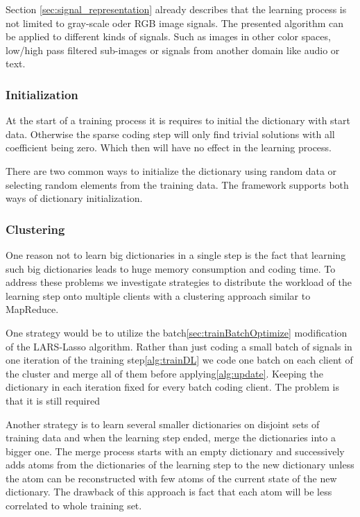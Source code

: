 Section \ref{sec:signal_representation} already describes that the learning
process is not limited to gray-scale oder RGB image signals. The presented
algorithm can be applied to different kinds of signals. Such as images in other
color spaces, low/high pass filtered sub-images or signals from another domain
like audio or text. 


\subsubsection{Initialization}
At the start of a training process it is requires to initial the
dictionary with start data. Otherwise the sparse coding step will only find
trivial solutions with all coefficient being zero. Which then will have no
effect in the learning process.

There are two common ways to initialize the dictionary using random data or
selecting random elements from the training data. The framework supports 
both ways of dictionary initialization. 


\subsubsection{Clustering}
One reason not to learn big dictionaries in a single step is the fact that
learning such big dictionaries leads to huge memory consumption and coding time.
To address these problems we investigate strategies to distribute the workload
of
the learning step onto multiple clients with a clustering approach similar to
MapReduce. 

One strategy would be to utilize the batch\ref{sec:trainBatchOptimize}
modification of the LARS-Lasso algorithm. Rather than just coding a small batch
of signals in one iteration of the training step\ref{alg:trainDL} we code one
batch on each client of the cluster and merge all of them before
applying\ref{alg:update}. Keeping the dictionary in each iteration fixed
for every batch coding client. The problem is that it is still required 

Another strategy is to learn several smaller dictionaries on disjoint sets of
training data and when the learning step ended, merge the dictionaries
into a bigger one. The merge process starts with an empty dictionary and
successively adds atoms from the dictionaries of the learning step to the
new dictionary unless the atom can be reconstructed with few atoms of the
current state of the new dictionary. The drawback of this approach is fact that 
each atom will be less correlated to whole training set.

